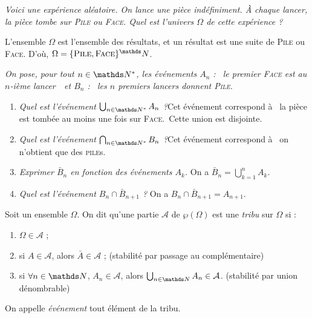 \begin{exo}
	\textsl{Voici une expérience aléatoire. On lance une pièce indéfiniment. À chaque lancer, la pièce tombe sur \textsc{Pile} ou \textsc{Face}. Quel est l’univers $\Omega$\/ de cette expérience ?}

	L'ensemble $\Omega$\/ est l'ensemble des résultats, et un résultat est une suite de \textsc{Pile} ou \textsc{Face}. D'où, $\Omega = \{\text{\textsc{Pile}}, \text{\textsc{Face}}\}^\N$.

	\textsl{On pose, pour tout $n \in \N^*$, les événements $A_n$\/ : \guillemotleft~le premier \textsc{Face} est au $n$-ième lancer~\guillemotright\ et $B_n$\/ : \guillemotleft~les $n$\/ premiers lancers donnent \textsc{Pile}.~\guillemotright}

	\begin{enumerate}
		\item \textsl{Quel est l'événement $\bigcup_{n \in \N^*} A_n$\/ ?}\@ Cet événement correspond à \guillemotleft~la pièce est tombée au moins une fois sur \textsc{Face}.~\guillemotright\@ Cette union est disjointe.
		\item \textsl{Quel est l'événement $\bigcap_{n \in \N^*} B_n$\/ ?}\@ Cet événement correspond à \guillemotleft~on n'obtient que des \textsc{pile}s.~\guillemotright
		\item \textsl{Exprimer $\bar{B}_n$\/ en fonction des événements $A_k$.} On a $\bar{B}_n = \bigcup_{k=1}^n A_k$.
		\item \textsl{Quel est l'événement $B_n \cap \bar{B}_{n+1}$\/ ?} On a $B_n \cap \bar{B}_{n+1} = A_{n+1}$.
	\end{enumerate}
\end{exo}

\begin{defn}
	Soit un ensemble $\Omega$. On dit qu'une partie $\mathcal{A}$ de $\wp(\Omega)$ est une \textit{tribu} sur $\Omega$ si :
	\begin{enumerate}
		\item $\Omega \in \mathcal{A}$\/ ;
		\item si $A \in \mathcal{A}$, alors $\bar{A} \in \mathcal{A}$\/ ; \hfill (stabilité par passage au complémentaire)
		\item si $\forall n \in \N$, $A_n \in \mathcal{A}$, alors $\bigcup_{n \in \N} A_n \in \mathcal{A}$. \hfill (stabilité par union dénombrable)
	\end{enumerate}

	On appelle \textit{événement} tout élément de la tribu.
\end{defn}

